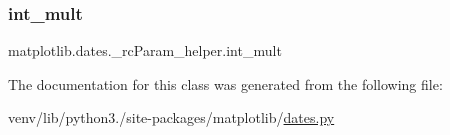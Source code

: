 \subsubsection{\texorpdfstring{int\+\_\+mult}{int\_mult}\hspace{0.1cm}{\footnotesize\ttfamily [2/2]}}
{\footnotesize\ttfamily matplotlib.\+dates.\+\_\+rc\+Param\+\_\+helper.\+int\+\_\+mult}



The documentation for this class was generated from the following file\+:\begin{DoxyCompactItemize}
\item 
venv/lib/python3./site-\/packages/matplotlib/\hyperlink{dates_8py}{dates.\+py}\end{DoxyCompactItemize}

